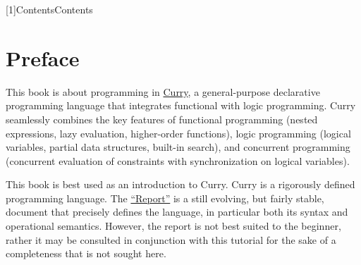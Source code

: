 \documentclass[11pt,fleqn]{report}
\newlength{\figurewidth}
\newcommand{\curryurl}{http://www.curry-lang.org}
\newcommand{\curry}%
  {\href{\curryurl}{Curry}}
\providecommand{\pdfbookmark}{}
\begin{document}
\sloppy

\begin{titlepage}
\begin{center}
\end{center}
\setcounter{page}{0} 
\end{titlepage}
\pdfbookmark[1]{Contents}{Contents}
\tableofcontents

\newpage
{}

\chapter*{Preface}

This book is about programming in \curry,
a general-purpose declarative programming language
that integrates functional with logic programming.
Curry seamlessly combines the key features of
functional programming (nested expressions, lazy evaluation,
higher-order functions), logic programming (logical variables,
partial data structures, built-in search), and concurrent
programming (concurrent evaluation of constraints with synchronization
on logical variables).

This book is best used as an introduction to Curry.
Curry is a rigorously defined programming language.
The \href{\curryurl/documentation/report}
{``Report''} is a still evolving, but fairly stable,
document that precisely defines the language,
in particular both its syntax and operational semantics.
However, the report is not best suited to the beginner,
rather it may be consulted in conjunction with this
tutorial for the sake of a completeness that is not sought here.
\end{document}

